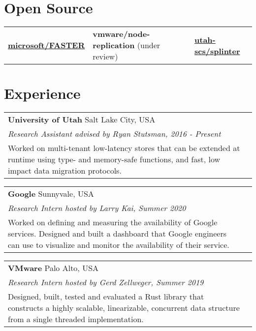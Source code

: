 \documentclass[margin,line]{res}
\begin{document}
\begin{resume}
\section{\sc Open Source}
\begin{tabular}{@{}p{2in}p{2in}p{2in}}
\href{{https://github.com/microsoft/FASTER}}{{\bf microsoft/FASTER}}
&
%
{\bf vmware/node-replication} ({\small under review})
&
%
\href{{https://github.com/utah-scs/splinter}}
{{\bf utah-scs/splinter}}
\end{tabular}

\section{\sc Experience}
\begin{tabular}{@{}p{5.5in}p{4in}}
{\bf University of Utah} \dotfill Salt Lake City, USA\\
{\small\em Research Assistant advised by Ryan Stutsman, 2016 - Present}\\
{\small Worked on multi-tenant low-latency stores that can
be extended at runtime using type- and memory-safe functions,
and fast,
low impact data migration protocols.}
\end{tabular}

\vspace{-2.5pt}
\begin{tabular}{@{}p{5.5in}p{4in}}
{\bf Google} \dotfill Sunnyvale, USA \\
{\small\em Research Intern hosted by Larry Kai, Summer 2020}\\
{\small Worked on defining and measuring the availability of Google
services. Designed and built a dashboard that Google engineers
can use to visualize and monitor the availability of their service.}
\end{tabular}

\vspace{-2.5pt}
\begin{tabular}{@{}p{5.5in}p{4in}}
{\bf VMware} \dotfill Palo Alto, USA \\
{\small\em Research Intern hosted by Gerd Zellweger, Summer 2019}\\
{\small
Designed,
built, tested and evaluated a Rust library that constructs a highly scalable, linearizable,
concurrent data
structure from a single threaded implementation.}
\end{tabular}


\end{resume}
\end{document}
